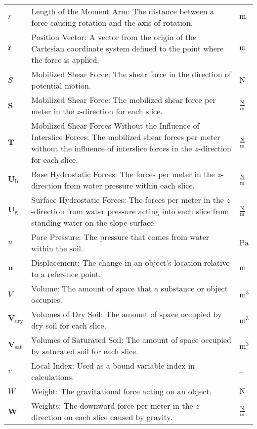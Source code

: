 \documentclass[12pt]{article}
\begin{document}
\begin{longtabu}{l X[l] l}
\\
$r$ & Length of the Moment Arm: The distance between a force causing rotation and the axis of rotation. & ${\text{m}}$
\\
$\symbf{r}$ & Position Vector: A vector from the origin of the Cartesian coordinate system defined to the point where the force is applied. & ${\text{m}}$
\\
$S$ & Mobilized Shear Force: The shear force in the direction of potential motion. & ${\text{N}}$
\\
$\symbf{S}$ & Mobilized Shear Force: The mobilized shear force per meter in the $z$-direction for each slice. & $\frac{\text{N}}{\text{m}}$
\\
$\symbf{T}$ & Mobilized Shear Forces Without the Influence of Interslice Forces: The mobilized shear forces per meter without the influence of interslice forces in the $z$-direction for each slice. & $\frac{\text{N}}{\text{m}}$
\\
${\symbf{U}_{\text{b}}}$ & Base Hydrostatic Forces: The forces per meter in the $z$-direction from water pressure within each slice. & $\frac{\text{N}}{\text{m}}$
\\
${\symbf{U}_{\text{g}}}$ & Surface Hydrostatic Forces: The forces per meter in the $z$-direction from water pressure acting into each slice from standing water on the slope surface. & $\frac{\text{N}}{\text{m}}$
\\
$u$ & Pore Pressure: The pressure that comes from water within the soil. & ${\text{Pa}}$
\\
$\symbf{u}$ & Displacement: The change in an object's location relative to a reference point. & ${\text{m}}$
\\
$V$ & Volume: The amount of space that a substance or object occupies. & ${\text{m}^{3}}$
\\
${\symbf{V}_{\text{dry}}}$ & Volumes of Dry Soil: The amount of space occupied by dry soil for each slice. & ${\text{m}^{3}}$
\\
${\symbf{V}_{\text{sat}}}$ & Volumes of Saturated Soil: The amount of space occupied by saturated soil for each slice. & ${\text{m}^{3}}$
\\
$v$ & Local Index: Used as a bound variable index in calculations. & --
\\
$W$ & Weight: The gravitational force acting on an object. & ${\text{N}}$
\\
$\symbf{W}$ & Weights: The downward force per meter in the $z$-direction on each slice caused by gravity. & $\frac{\text{N}}{\text{m}}$
\\

\end{longtabu}
\end{document}
